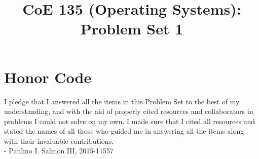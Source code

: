 \documentclass[conference]{IEEEtran}
\newcommand\tab[1][0.5cm]{\hspace*{#1}}
\begin{document}
\title{CoE 135 (Operating Systems): Problem Set 1\\
}

\author{
	}		
\maketitle

\section{Honor Code}
I pledge that I answered all the items in this Problem Set to the best of my understanding,
and with the aid of properly cited resources and collaborators in problems I could not solve on my
own. I made sure that I cited all resources and stated the names of all those who guided me in
answering all the items along with their invaluable contributions. \\
\tab - Paulino I. Salmon III, 2015-11557

\end{document}
